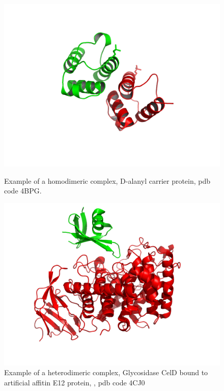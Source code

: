 \begin{figure}[!ht]
\label{Fig:Step1Purification}
    \begin{minipage}{0.49\linewidth}
    \begin{centering}
      \includegraphics[width=1\linewidth]{Intro/Fig/HomoDimer.png}  
      \caption[Example of a homodimeric complex]{Example of a homodimeric complex,  D-alanyl carrier protein, pdb code 4BPG.}\label{fig:exampleHomoDimer}
    \end{centering}
    \end{minipage}
    \hfill
    \begin{minipage}{0.49\linewidth}
    \begin{centering}
      \includegraphics[width=1\linewidth]{Intro/Fig/HeteroDimer.png}  
      \caption[Example of a heterodimeric complex]{Example of a heterodimeric complex,  Glycosidase CelD bound to artificial affitin E12 protein, \cite{correa2014potent}, pdb code 4CJ0}\label{fig:exampleHeteroDimer}
    \end{centering}
    \end{minipage}
\end{figure}


